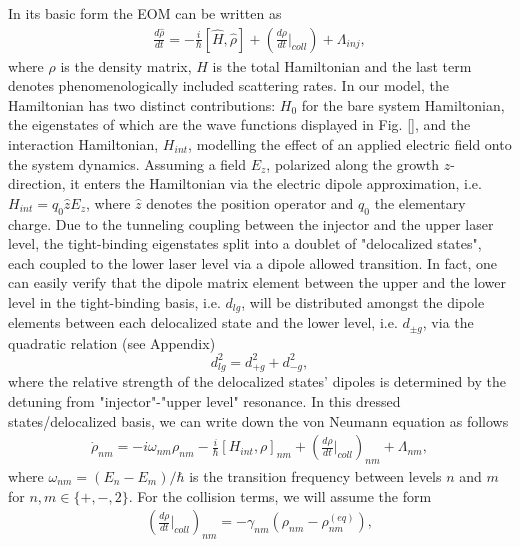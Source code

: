 \documentclass[preprint,secnumarabic,amssymb, nobibnotes, aip, prd]{revtex4-1}
\begin{document}
	In its basic form the EOM can be written as 
	\begin{align}
	\frac{d\hat\rho}{dt} = -\frac{i}{\hbar}[\hat H,\hat\rho] + (\frac{d \rho }{dt}|_{coll}) + \Lambda_{inj},
	\end{align}
	where $\rho$ is the density matrix, $H$ is the total Hamiltonian and the last term denotes phenomenologically included scattering rates. In our model, the Hamiltonian has two distinct contributions: $H_0$ for the bare system Hamiltonian, the eigenstates of which are the wave functions displayed in Fig. \ref{}, and the interaction Hamiltonian, $H_{int}$, modelling the effect of an applied electric field onto the system dynamics. Assuming a field $E_z$, polarized along the growth $z$-direction, it enters the Hamiltonian via the electric dipole approximation, i.e. $H_{int} = q_0 \hat{z} E_z$, where $\hat{z}$ denotes the position operator and $q_0$ the elementary charge. Due to the tunneling coupling between the injector and the upper laser level, the tight-binding eigenstates split into a doublet of "delocalized states", each coupled to the lower laser level via a dipole allowed transition. In fact, one can easily verify that the dipole matrix element between the upper and the lower level in the tight-binding basis, i.e. $d_{lg}$, will be distributed amongst the dipole elements between each delocalized state and the lower level, i.e. $d_{\pm g}$, via the quadratic relation (see Appendix)
	\begin{equation}
	d_{lg}^2 =d_{+g}^2+d_{-g}^2,
	\end{equation} 
	where the relative strength of the delocalized states' dipoles is determined by the detuning from "injector"-"upper level" resonance. In this dressed states/delocalized basis, we can write down the von Neumann equation as follows
	\begin{align}
	\label{eq:EOM_nm}
	\dot{\rho}_{nm} = -i\omega_{nm}\rho_{nm}  - \frac{i}{\hbar} [H_{int},\rho]_{nm} + (\frac{d \rho }{dt}|_{coll})_{nm} + \Lambda_{nm},
	\end{align}
	where $\omega_{nm} = (E_n-E_m)/\hbar$ is the transition frequency between levels $n$ and $m$ for $n,m \in\{+,-,2\}$. For the collision terms, we will assume the form 
	\begin{align}
	(\frac{d \rho }{dt}|_{coll})_{nm} = -\gamma_{nm}(\rho_{nm}-\rho_{nm}^{(eq)}),
	\end{align}
\end{document}
